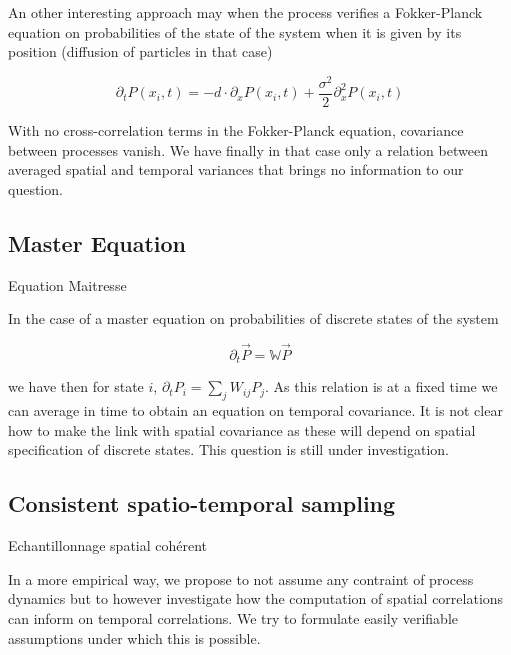 An other interesting approach may when the process verifies a Fokker-Planck equation on probabilities of the state of the system when it is given by its position (diffusion of particles in that case)

\begin{equation}
\partial_t P(x_i,t) = - d \cdot \partial_x P(x_i,t) + \frac{\sigma^2}{2} \partial^2_x P(x_i,t)
\end{equation}

With no cross-correlation terms in the Fokker-Planck equation, covariance between processes vanish. We have finally in that case only a relation between averaged spatial and temporal variances that brings no information to our question.

\subsection{Master Equation}{Equation Maitresse}

In the case of a master equation on probabilities of discrete states of the system

\begin{equation}
\partial_t \vec{P} = \mathbb{W} \vec{P}
\end{equation}

we have then for state $i$, $\partial_t P_i = \sum_j W_{ij}P_j$. As this relation is at a fixed time we can average in time to obtain an equation on temporal covariance. It is not clear how to make the link with spatial covariance as these will depend on spatial specification of discrete states. This question is still under investigation.


\subsection{Consistent spatio-temporal sampling}{Echantillonnage spatial cohérent}

In a more empirical way, we propose to not assume any contraint of process dynamics but to however investigate how the computation of spatial correlations can inform on temporal correlations. We try to formulate easily verifiable assumptions under which this is possible.

